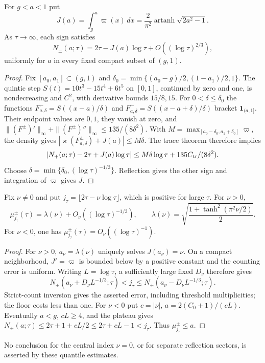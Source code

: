 \begin{theorem}\label{v7:thm:cumulative-count}
For $g<a<1$ put
\begin{equation}\label{v7:eq:J}
 J(a)=\int_g^a\varpi(x)\,dx
 =\frac2{\pi^2}\operatorname{artanh}\sqrt{2a^2-1}.
\end{equation}
As $\tau\to\infty$, each sign satisfies
\begin{equation}\label{v7:eq:cumulative-count}
 N_\pm(a;\tau)=2\tau-J(a)\log\tau
                    +O((\log\tau)^{2/3}),
\end{equation}
uniformly for $a$ in every fixed compact subset of $(g,1)$.
\end{theorem}
\begin{proof}
Fix $[a_0,a_1]\subset(g,1)$ and
$\delta_0=\min\{(a_0-g)/2,(1-a_1)/2,1\}$.
The quintic step $S(t)=10t^3-15t^4+6t^5$ on $[0,1]$, continued by zero
and one, is nondecreasing and $C^2$, with derivative bounds $15/8,15$.
For $0<\delta\le\delta_0$ the functions
$F^-_{a,\delta}=S((x-a)/\delta)$ and
$F^+_{a,\delta}=S((x-a+\delta)/\delta)$ bracket $\mathbf1_{(a,1]}$.
Their endpoint values are $0,1$, they vanish at zero, and
$\|(F^\pm)'\|_\infty+\|(F^\pm)''\|_\infty\le135/(8\delta^2)$.
With $M=\max_{[a_0-\delta_0,a_1+\delta_0]}\varpi$, the density gives
$|\varkappa(F^\pm_{a,\delta})+J(a)|\le M\delta$.
The trace theorem therefore implies
\[
 |N_+(a;\tau)-2\tau+J(a)\log\tau|
 \le M\delta\log\tau+135C_{\rm tr}/(8\delta^2).
\]
Choose $\delta=\min\{\delta_0,(\log\tau)^{-1/3}\}$.
Reflection gives the other sign and integration of $\varpi$ gives $J$.
\end{proof}

\begin{corollary}\label{v7:cor:quantiles}
Fix $\nu\ne0$ and put
$j_\tau=\lfloor2\tau-\nu\log\tau\rfloor$, which is positive for large $\tau$.
For $\nu>0$,
\begin{equation}\label{v7:eq:quantile}
 \mu_{j_\tau}^{\pm}(\tau)=\lambda(\nu)+O_\nu((\log\tau)^{-1/3}),
 \qquad
 \lambda(\nu)=\sqrt{\frac{1+\tanh^2(\pi^2\nu/2)}2}.
\end{equation}
For $\nu<0$, one has
$\mu_{j_\tau}^{\pm}(\tau)=O_\nu((\log\tau)^{-1})$.
\end{corollary}
\begin{proof}
For $\nu>0$, $a_\nu=\lambda(\nu)$ uniquely solves $J(a_\nu)=\nu$.
On a compact neighborhood, $J'=\varpi$ is bounded below by a positive
constant and the counting error is uniform. Writing $L=\log\tau$,
a sufficiently large fixed $D_\nu$ therefore gives
\[
 N_\pm(a_\nu+D_\nu L^{-1/3};\tau)<j_\tau
 \le N_\pm(a_\nu-D_\nu L^{-1/3};\tau).
\]
Strict-count inversion gives the asserted error, including threshold
multiplicities; the floor costs less than one.
For $\nu<0$ put $c=|\nu|$, $a=2(C_0+1)/(cL)$.
Eventually $a<g$, $cL\ge4$, and the plateau gives
$N_\pm(a;\tau)\le2\tau+1+cL/2\le2\tau+cL-1<j_\tau$.
Thus $\mu_{j_\tau}^\pm\le a$.
\end{proof}
No conclusion for the central index $\nu=0$, or for separate reflection
sectors, is asserted by these quantile estimates.


